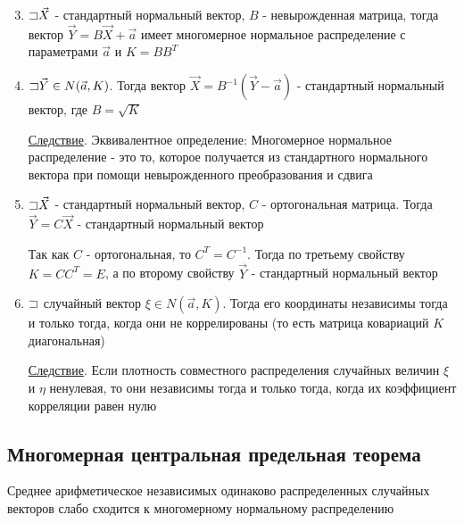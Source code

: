 \documentclass[12pt]{article}
\begin{document}
\begin{enumerate}
    \setcounter{enumi}{2}

    \item $\mathord{\sqsupset} \vec X$ - стандартный нормальный вектор, $B$ - невырожденная матрица, 
    тогда вектор $\vec Y = B \vec X + \vec a$ имеет многомерное нормальное распределение с параметрами $\vec a$ и $K = B B^T$

    \item $\mathord{\sqsupset} \vec Y \in N(\vec a, K)$. Тогда вектор $\vec X = B^{-1} (\vec Y - \vec a)$ - стандартный нормальный вектор, где $B = \sqrt{K}$

    \underline{Следствие}. Эквивалентное определение: Многомерное нормальное распределение - это то, которое получается из
    стандартного нормального вектора при помощи невырожденного преобразования и сдвига

    \item $\mathord{\sqsupset} \vec X$ - стандартный нормальный вектор, $C$ - ортогональная матрица. Тогда $\vec Y = C \vec X$ - стандартный нормальный вектор

    \begin{MyProof}
        Так как $C$ - ортогональная, то $C^T = C^{-1}$. Тогда по третьему свойству $K = C C^T = E$, а по второму свойству $\vec Y$ - стандартный нормальный вектор
    \end{MyProof}

    \item $\mathord{\sqsupset}$ случайный вектор $\xi \in N(\vec a, K)$.
    Тогда его координаты независимы тогда и только тогда, когда они не коррелированы (то есть матрица ковариаций $K$ диагональная)

    \underline{Следствие}. Если плотность совместного распределения случайных величин $\xi$ и $\eta$ ненулевая, то они независимы тогда и только тогда, 
    когда их коэффициент корреляции равен нулю
\end{enumerate}

\subsection{Многомерная центральная предельная теорема}

\begin{MyTheorem} 
    \Ths Среднее арифметическое независимых одинаково распределенных случайных векторов слабо сходится к многомерному нормальному распределению
\end{MyTheorem}
\end{document}
